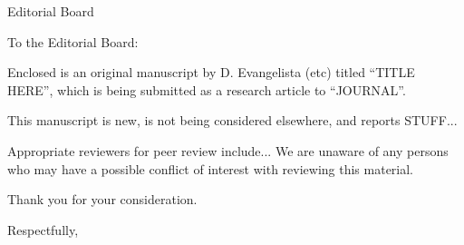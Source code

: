 \documentclass[ucb,ib,12pt]{ucletter}
\date{\today}
\begin{document}
\begin{letter}{Editorial Board}

\opening{To the Editorial Board:}

Enclosed is an original manuscript by D. Evangelista (etc) titled ``TITLE HERE'', which is being submitted as a research article to ``JOURNAL''. 
 
This manuscript is new, is not being considered elsewhere, and reports STUFF... 
 
Appropriate reviewers for peer review include...  We are unaware of any persons who may have a possible conflict of interest with reviewing this material. 
 
Thank you for your consideration.

\closing{Respectfully,}
\end{letter}
\end{document}
